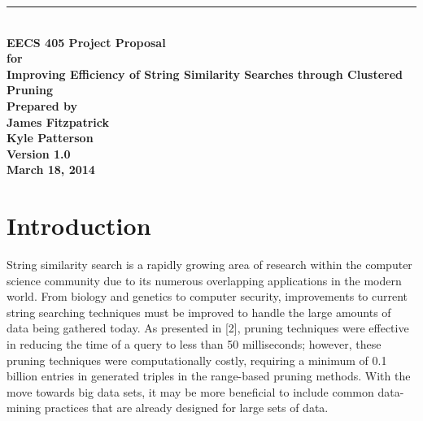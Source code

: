 \documentclass[pdftex,12pt,letter]{article}
\newcommand{\HRule}{\rule{\linewidth}{0.5mm}}
\begin{document}
\begin{titlepage}
\begin{flushright}
\HRule \\[0.4cm]
{ \bfseries
{\huge EECS 405 Project Proposal\\[1cm]}
{\Large for\\[1cm]}
{\large Improving Efficiency of String Similarity Searches through Clustered Pruning\\[3cm]}
{\large Prepared by\\[1cm]James Fitzpatrick\\Kyle Patterson\\[2cm]
Version 1.0\\
March 18, 2014\\
}}
\end{flushright}
\end{titlepage}

\tableofcontents
\newpage

\section{Introduction}
String similarity search is a rapidly growing area of research within the computer science community due to its numerous overlapping applications in the modern world. From biology and genetics to computer security, improvements to current string searching techniques must be improved to handle the large amounts of data being gathered today.  As presented in [2], pruning techniques were effective in reducing the time of a query to less than 50 milliseconds; however, these pruning techniques were computationally costly, requiring a minimum of 0.1 billion entries in generated triples in the range-based pruning methods. With the move towards big data sets, it may be more beneficial to include common data-mining practices that are already designed for large sets of data.
\end{document}
